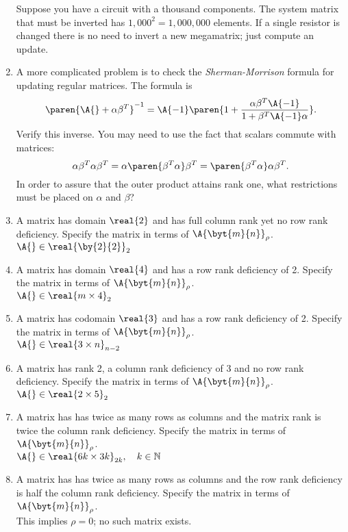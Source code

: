 \begin{enumerate}
Suppose you have a circuit with a thousand components. The system matrix that must be inverted has $1,000^{2}=1,000,000$ elements. If a single resistor is changed there is no need to invert a new megamatrix; just compute an update.
\item A more complicated problem is to check the \textit{Sherman-Morrison} formula for updating regular matrices. The formula is
\begin{equation}
  \paren{\A{}+\alpha \beta^{T}}^{-1} = \A{-1}\paren{1+\frac{\alpha \beta^{T}\A{-1}}{1+\beta^{T}\A{-1}\alpha}}.
\end{equation}
Verify this inverse. You may need to use the fact that scalars commute with matrices:
\begin{equation}
  \alpha \beta^{T}\alpha \beta^{T}=\alpha \paren{\beta^{T}\alpha} \beta^{T}=\paren{\beta^{T}\alpha}\alpha \beta^{T}.
\end{equation}
In order to assure that the outer product attains rank one, what restrictions must be placed on $\alpha$ and $\beta$?
\item A matrix has domain $\real{2}$ and has full column rank yet no row rank deficiency. Specify the matrix in terms of $\A{\byt{m}{n}}_{\rho}$.\\
$\A{}\in\real{\by{2}{2}}_{2}$
\item A matrix has domain $\real{4}$ and has a row rank deficiency of 2. Specify the matrix in terms of $\A{\byt{m}{n}}_{\rho}$.\\
$\A{}\in\real{m\times 4}_{2}$
\item A matrix has codomain $\real{3}$ and has a row rank deficiency of 2. Specify the matrix in terms of $\A{\byt{m}{n}}_{\rho}$.\\
$\A{}\in\real{3\times n}_{n-2}$
\item A matrix has rank 2, a column rank deficiency of 3 and no row rank deficiency. Specify the matrix in terms of $\A{\byt{m}{n}}_{\rho}$.\\
$\A{}\in\real{2\times 5}_{2}$
\item A matrix has has twice as many rows as columns and the matrix rank is twice the column rank deficiency. Specify the matrix in terms of $\A{\byt{m}{n}}_{\rho}$.\\
$\A{}\in\real{6k\times 3k}_{2k}, \quad k\in\mathbb{N}$
\item A matrix has has twice as many rows as columns and the row rank deficiency is half the column rank deficiency. Specify the matrix in terms of $\A{\byt{m}{n}}_{\rho}$.\\
This implies $\rho=0$; no such matrix exists.

\end{enumerate}


\endinput